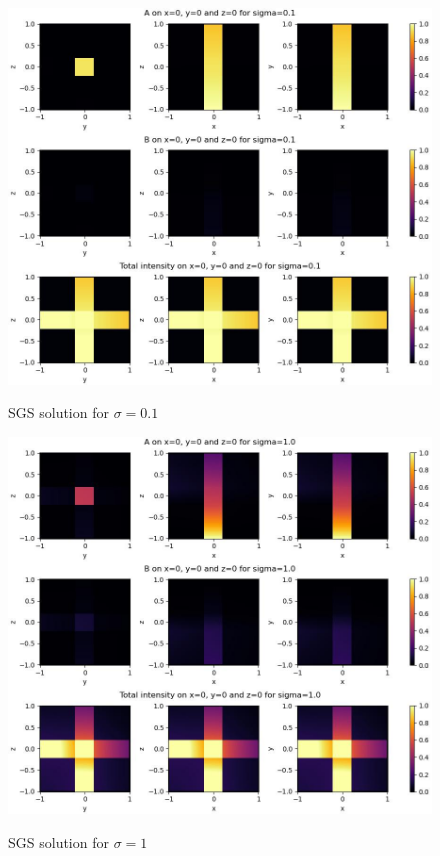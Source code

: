 \documentclass[11pt,titlepage]{article}
\begin{document}
\begin{figure}[H]
    \caption{SGS solution for $\sigma=0.1$}
    \hspace*{-2cm}\centering
    \includegraphics[scale=0.8]{img/2d_sym_gauss_seidel_0.1.jpg}
    \label{fig:sgs_0.1}
\end{figure}

\begin{figure}[H]
    \caption{SGS solution for $\sigma=1$}
    \hspace*{-2cm}\centering
    \includegraphics[scale=0.8]{img/2d_sym_gauss_seidel_1.0.jpg}
    \label{fig:sgs_1}
\end{figure}
\end{document}

